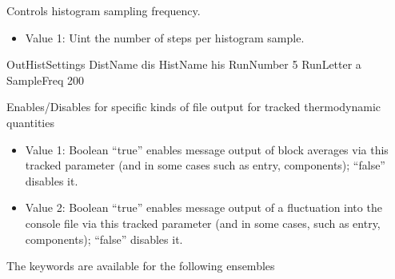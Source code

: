\documentclass[letterpaper,10pt,english]{sphinxmanual}
\begin{document}
\begin{description}
\begin{itemize}
\end{itemize}

\item[{\sphinxcode{\sphinxupquote{SampleFreq}}}] \leavevmode
\sphinxAtStartPar
Controls histogram sampling frequency.
\begin{itemize}
\item {} 
\sphinxAtStartPar
Value 1: Uint \textendash{} the number of steps per histogram sample.

\end{itemize}

\begin{sphinxVerbatim}[commandchars=\\\{\}]
\PYGZsh{}\PYGZsh{}\PYGZsh{}\PYGZsh{}\PYGZsh{}\PYGZsh{}\PYGZsh{}\PYGZsh{}\PYGZsh{}\PYGZsh{}\PYGZsh{}\PYGZsh{}\PYGZsh{}\PYGZsh{}\PYGZsh{}\PYGZsh{}\PYGZsh{}\PYGZsh{}\PYGZsh{}\PYGZsh{}\PYGZsh{}\PYGZsh{}\PYGZsh{}\PYGZsh{}\PYGZsh{}\PYGZsh{}\PYGZsh{}\PYGZsh{}\PYGZsh{}\PYGZsh{}\PYGZsh{}\PYGZsh{}\PYGZsh{}
\PYGZsh{} OutHistSettings
\PYGZsh{}\PYGZsh{}\PYGZsh{}\PYGZsh{}\PYGZsh{}\PYGZsh{}\PYGZsh{}\PYGZsh{}\PYGZsh{}\PYGZsh{}\PYGZsh{}\PYGZsh{}\PYGZsh{}\PYGZsh{}\PYGZsh{}\PYGZsh{}\PYGZsh{}\PYGZsh{}\PYGZsh{}\PYGZsh{}\PYGZsh{}\PYGZsh{}\PYGZsh{}\PYGZsh{}\PYGZsh{}\PYGZsh{}\PYGZsh{}\PYGZsh{}\PYGZsh{}\PYGZsh{}\PYGZsh{}\PYGZsh{}\PYGZsh{}
DistName   dis
HistName   his
RunNumber  5
RunLetter  a
SampleFreq 200
\end{sphinxVerbatim}

\item[{\sphinxcode{\sphinxupquote{OutEnergy, OutPressure, OutMolNumber, OutDensity, OutVolume, OutSurfaceTension}}}] \leavevmode
\sphinxAtStartPar
Enables/Disables for specific kinds of file output for tracked thermodynamic quantities
\begin{itemize}
\item {} 
\sphinxAtStartPar
Value 1: Boolean \textendash{} “true” enables message output of block averages via this tracked parameter (and in some cases such as entry, components); “false” disables it.

\item {} 
\sphinxAtStartPar
Value 2: Boolean \textendash{} “true” enables message output of a fluctuation into the console file via this tracked parameter (and in some cases, such as entry, components); “false” disables it.

\end{itemize}

\sphinxAtStartPar
The keywords are available for the following ensembles



\end{description}
\end{document}
